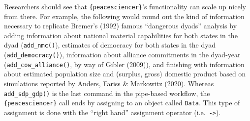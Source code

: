 \documentclass[
  11pt,
]{article}
\begin{document}
Researchers should see that \texttt{\{peacesciencer\}}'s functionality can scale up nicely from there. For example, the following would round out the kind of information necessary to replicate Bremer's (1992) famous ``dangerous dyads'' analysis by adding information about national material capabilities for both states in the dyad (\texttt{add\_nmc()}), estimates of democracy for both states in the dyad (\texttt{add\_democracy()}), information about alliance commitments in the dyad-year (\texttt{add\_cow\_alliance()}, by way of Gibler (2009)), and finishing with information about estimated population size and (surplus, gross) domestic product based on simulations reported by Anders, Fariss \& Markowitz (2020). Whereas \texttt{add\_sdp\_gdp()} is the last command in the pipe-based workflow, the \texttt{\{peacesciencer\}} call ends by assigning to an object called \texttt{Data}. This type of assignment is done with the ``right hand'' assignment operator (i.e.~\texttt{-\textgreater{}}).
\end{document}
